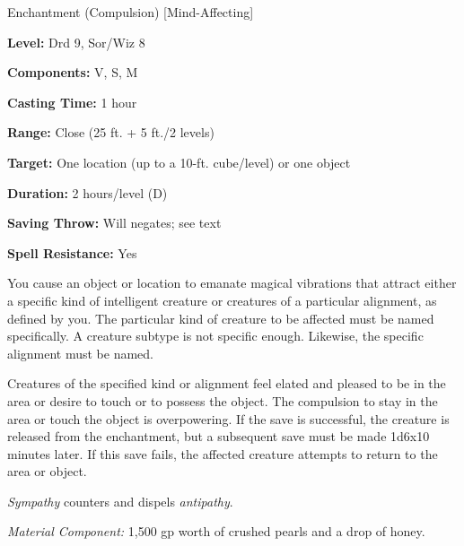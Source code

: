 
Enchantment (Compulsion) [Mind-Affecting]

\textbf{Level:} Drd 9, Sor/Wiz 8

\textbf{Components:} V, S, M

\textbf{Casting Time:} 1 hour

\textbf{Range:} Close (25 ft. + 5 ft./2 levels)

\textbf{Target:} One location (up to a 10-ft. cube/level) or one object

\textbf{Duration:} 2 hours/level (D)

\textbf{Saving Throw:} Will negates; see text

\textbf{Spell Resistance:} Yes

You cause an object or location to emanate magical vibrations that attract either 
a specific kind of intelligent creature or creatures of a particular alignment, 
as defined by you. The particular kind of creature to be affected must be named 
specifically. A creature subtype is not specific enough. Likewise, the specific 
alignment must be named.

Creatures of the specified kind or alignment feel elated and pleased to be in the 
area or desire to touch or to possess the object. The compulsion to stay in the 
area or touch the object is overpowering. If the save is successful, the creature 
is released from the enchantment, but a subsequent save must be made 1d6x10 minutes 
later. If this save fails, the affected creature attempts to return to the area 
or object.

\textit{Sympathy} counters and dispels \textit{antipathy}.

\textit{Material Component:} 1,500 gp worth of crushed pearls and a drop of honey.





